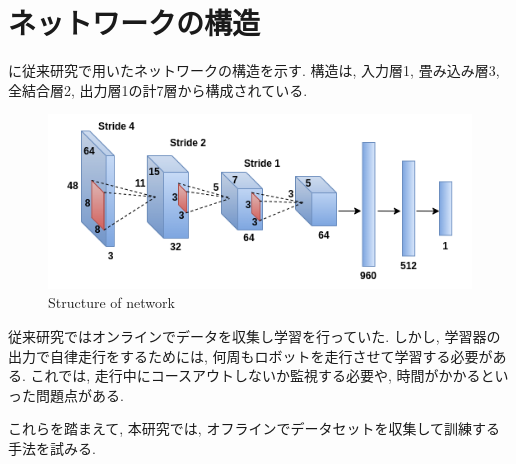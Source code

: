 \newpage
\section{ネットワークの構造}
に従来研究で用いたネットワークの構造を示す. 構造は, 入力層1, 畳み込み層3, 全結合層2, 出力層1の計7層から構成されている.

\begin{figure}[h]
  \centering
  \includegraphics[keepaspectratio, scale=0.6]{images/cnn.png}
  \caption{Structure of network}
  \label{Fig:cnn}
  \end{figure}

\vspace{10mm}
従来研究ではオンラインでデータを収集し学習を行っていた. しかし, 学習器の出力で自律走行をするためには, 何周もロボットを走行させて学習する必要がある. これでは, 走行中にコースアウトしないか監視する必要や, 時間がかかるといった問題点がある. \par これらを踏まえて, 本研究では, オフラインでデータセットを収集して訓練する手法を試みる. 


